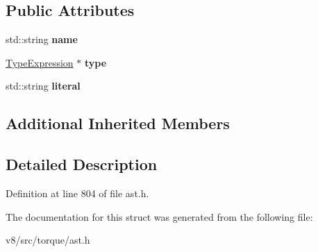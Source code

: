 \subsection*{Public Attributes}
\begin{DoxyCompactItemize}
\item 
\mbox{\label{structv8_1_1internal_1_1torque_1_1ExternConstDeclaration_ac5fd14232fe86ed638ff3bf479cea41a}} 
std\+::string {\bfseries name}
\item 
\mbox{\label{structv8_1_1internal_1_1torque_1_1ExternConstDeclaration_a35a6ad59d73d8a00e7dda8497fbb053e}} 
\mbox{\hyperlink{structv8_1_1internal_1_1torque_1_1TypeExpression}{Type\+Expression}} $\ast$ {\bfseries type}
\item 
\mbox{\label{structv8_1_1internal_1_1torque_1_1ExternConstDeclaration_a9d7cc6dfe297b775de3a8b80f168ed13}} 
std\+::string {\bfseries literal}
\end{DoxyCompactItemize}
\subsection*{Additional Inherited Members}


\subsection{Detailed Description}


Definition at line 804 of file ast.\+h.



The documentation for this struct was generated from the following file\+:\begin{DoxyCompactItemize}
\item 
v8/src/torque/ast.\+h\end{DoxyCompactItemize}
